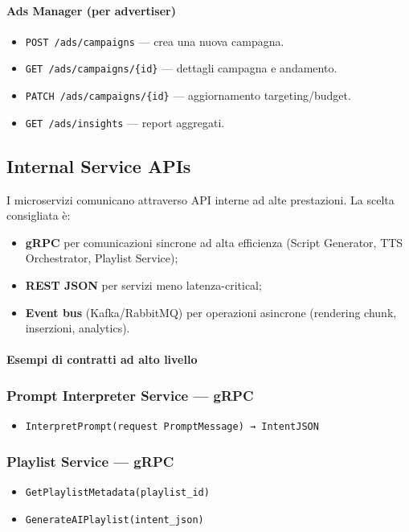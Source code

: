 \documentclass[11pt,a4paper]{article}
\begin{document}
\paragraph{Ads Manager (per advertiser)}
\begin{itemize}
    \item \verb|POST /ads/campaigns| — crea una nuova campagna.
    \item \verb|GET /ads/campaigns/{id}| — dettagli campagna e andamento.
    \item \verb|PATCH /ads/campaigns/{id}| — aggiornamento targeting/budget.
    \item \verb|GET /ads/insights| — report aggregati.
\end{itemize}


\subsection{Internal Service APIs}

I microservizi comunicano attraverso API interne ad alte prestazioni.  
La scelta consigliata è:
\begin{itemize}
    \item \textbf{gRPC} per comunicazioni sincrone ad alta efficienza (Script Generator, TTS Orchestrator, Playlist Service);
    \item \textbf{REST JSON} per servizi meno latenza-critical;
    \item \textbf{Event bus} (Kafka/RabbitMQ) per operazioni asincrone (rendering chunk, inserzioni, analytics).
\end{itemize}

\paragraph{Esempi di contratti ad alto livello}

\subsubsection*{Prompt Interpreter Service — gRPC}
\begin{itemize}
    \item \verb|InterpretPrompt(request PromptMessage) → IntentJSON|
\end{itemize}

\subsubsection*{Playlist Service — gRPC}
\begin{itemize}
    \item \verb|GetPlaylistMetadata(playlist_id)|
    \item \verb|GenerateAIPlaylist(intent_json)|
\end{itemize}
\end{document}
